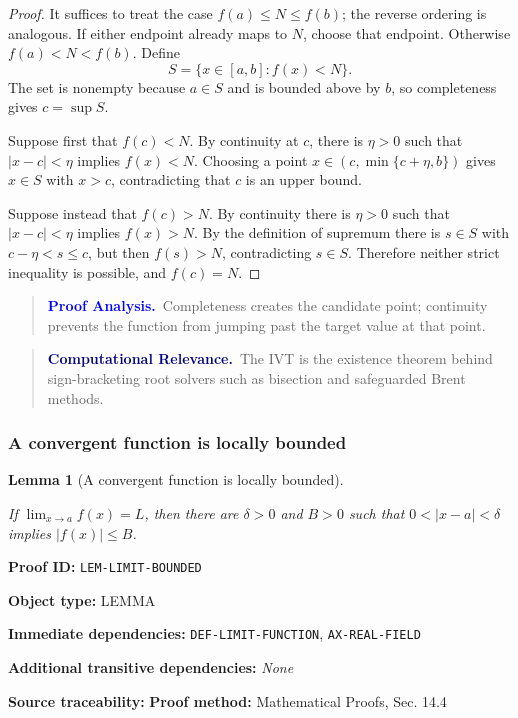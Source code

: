 \documentclass[10pt]{article}
\newcommand{\pidraw}[1]{\begingroup\urlstyle{tt}\nolinkurl{#1}\endgroup}
\newtheorem{lemma}[theorem]{Lemma}
\theoremstyle{definition}
\theoremstyle{remark}
\newenvironment{proofanalysis}
{\begin{quote}\small\noindent\textbf{\textcolor{blue}{Proof Analysis.}}\ }
{\end{quote}}
\newenvironment{computationalrelevance}
{\begin{quote}\small\noindent\textbf{\textcolor{navy}{Computational Relevance.}}\ }
{\end{quote}}
\newcommand{\meta}[2]{\noindent\textbf{#1:} #2\par}
\begin{document}
\begin{proof}

It suffices to treat the case $f(a)\le N\le f(b)$; the reverse ordering is analogous.
If either endpoint already maps to $N$, choose that endpoint. Otherwise
$f(a)<N<f(b)$. Define
\[
S=\{x\in[a,b]: f(x)<N\}.
\]
The set is nonempty because $a\in S$ and is bounded above by $b$, so completeness
gives $c=\sup S$.

Suppose first that $f(c)<N$. By continuity at $c$, there is $\eta>0$ such that
$|x-c|<\eta$ implies $f(x)<N$. Choosing a point
$x\in(c,\min\{c+\eta,b\})$ gives $x\in S$ with $x>c$, contradicting that $c$
is an upper bound.

Suppose instead that $f(c)>N$. By continuity there is $\eta>0$ such that
$|x-c|<\eta$ implies $f(x)>N$. By the definition of supremum there is
$s\in S$ with $c-\eta<s\le c$, but then $f(s)>N$, contradicting $s\in S$.
Therefore neither strict inequality is possible, and $f(c)=N$.

\end{proof}

\begin{proofanalysis}Completeness creates the candidate point; continuity prevents the function from jumping past the target value at that point.\end{proofanalysis}

\begin{computationalrelevance}The IVT is the existence theorem behind sign-bracketing root solvers such as bisection and safeguarded Brent methods.\end{computationalrelevance}

\subsubsection{A convergent function is locally bounded}

\begin{lemma}[A convergent function is locally bounded]\label{prf:LEM-LIMIT-BOUNDED}

If $\lim_{x\to a}f(x)=L$, then there are $\delta>0$ and $B>0$ such that
$0<|x-a|<\delta$ implies $|f(x)|\le B$.

\end{lemma}

\meta{Proof ID}{\pidraw{LEM-LIMIT-BOUNDED}}
\meta{Object type}{LEMMA}
\meta{Immediate dependencies}{\pidraw{DEF-LIMIT-FUNCTION}, \pidraw{AX-REAL-FIELD}}
\meta{Additional transitive dependencies}{\emph{None}}
\meta{Source traceability}{\textbf{Proof method:} Mathematical Proofs, Sec. 14.4}
\end{document}
